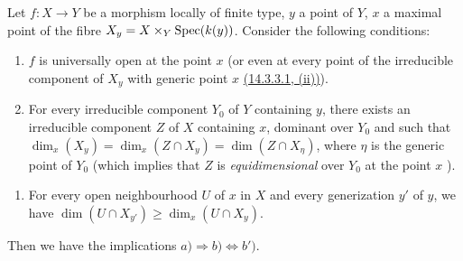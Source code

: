 \begin{proposition}[14.3.13]
\label{IV.14.3.13}
Let $f:X\to Y$ be a morphism locally of finite type, $y$ a point of $Y$, $x$ a maximal point of the fibre $X_y=X\times_Y\operatorname{Spec}(k(y))$.
Consider the following conditions:
\begin{enumerate}[label=\emph{\alph*)}]
  \item $f$ is universally open at the point $x$ (or even at every point of the irreducible component of $X_y$ with generic point $x$ {\hyperref[IV.14.3.3.1]{(14.3.3.1, (ii))}}).
  \item For every irreducible component $Y_0$ of $Y$ containing $y$, there exists an irreducible component $Z$ of $X$ containing $x$, dominant over $Y_0$ and such that $\dim_x(X_y)=\dim_x(Z\cap X_y)=\dim(Z\cap X_\eta)$, where $\eta$ is the generic point of $Y_0$ (which implies that $Z$ is \emph{equidimensional} over $Y_0$ at the point $x$ ).
\end{enumerate}


\begin{enumerate}[label=\emph{\alph*$'$)}]
  \item[b$'$)] For every open neighbourhood $U$ of $x$ in $X$ and every generization $y'$ of $y$, we have $\dim(U\cap X_{y'})\geq\dim_x(U\cap X_y)$.
\end{enumerate}

Then we have the implications $a)\Rightarrow b)\Leftrightarrow b')$.
\end{proposition}

